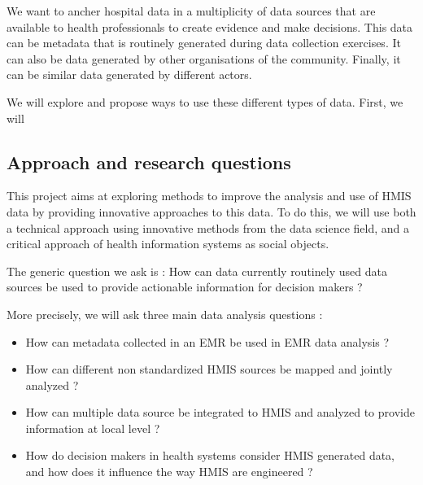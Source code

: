 We want to ancher hospital data in a multiplicity of data sources that are available to health professionals to create evidence and make decisions. This data can be metadata that is routinely generated during data collection exercises. It can also be data generated by other organisations of the community. Finally, it can be similar data generated by different actors.

We will explore and propose ways to use these different types of data. First, we will


\subsection{Approach and research questions}




This project aims at exploring methods to improve the analysis and use of HMIS data by providing innovative approaches to this data. To do this, we will use both a technical approach using innovative methods from the data science field, and a critical approach of health information systems as social objects.

The generic question we ask is : How can data currently routinely used data sources be used to provide actionable information for decision makers ?

More precisely, we will ask three main data analysis questions :
\begin{itemize}
	\item How can metadata collected in an EMR be used in EMR data analysis ?
	\item How can different non standardized HMIS sources be mapped and jointly analyzed ?
	\item How can multiple data source be integrated to HMIS and analyzed to provide information at local level ?
	\item How do decision makers in health systems consider HMIS generated data, and how does it influence the way HMIS are engineered ?
\end{itemize}


